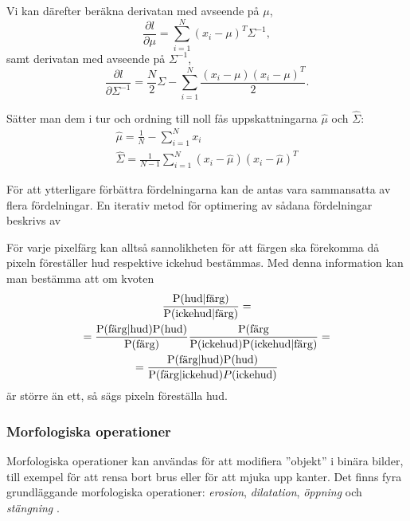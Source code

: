 \documentclass[../rapport_MVEX01-11-05]{subfiles}
\begin{document}
Vi kan därefter beräkna derivatan med avseende på $\mu$,
\begin{equation*}
  \frac{\partial l}{\partial \mu}=\sum_{i=1}^N(x_i-\mu)^T\Sigma^{-1},
\end{equation*}
samt derivatan med avseende på $\Sigma^{-1}$,
\begin{equation*}
  \frac{\partial l}{\partial \Sigma^{-1}}=\frac{N}{2}\Sigma
  -\sum_{i=1}^N\frac{(x_i-\mu)(x_i-\mu)^T}{2}.
\end{equation*}

Sätter man dem i tur och ordning till noll fås uppskattningarna
$\hat\mu$ och $\hat\Sigma$:
\begin{gather*}
  \hat\mu    =\frac{1}{N}-\sum_{i=1}^Nx_i\\
  \hat\Sigma =\frac{1}{N-1}\sum_{i=1}^N(x_i-\hat\mu)(x_i-\hat\mu)^T
\end{gather*}

För att ytterligare förbättra fördelningarna kan de antas vara
sammansatta av flera fördelningar. En iterativ metod för optimering av
sådana fördelningar beskrivs av 

För varje pixelfärg kan alltså sannolikheten för att färgen ska
förekomma då pixeln föreställer hud
respektive ickehud bestämmas. Med denna information kan man bestämma
att om kvoten 
\begin{multline*}
\frac{\mathrm{P}(\textrm{hud}|\textrm{färg})}{\mathrm{P}(\textrm{ickehud}|\textrm{färg})}=\\
=\frac{\mathrm{P}(\textrm{färg}|\textrm{hud})\mathrm{P}(\textrm{hud})}{\mathrm{P}(\textrm{färg})}
 \frac{\mathrm{P}(\textrm{färg}}{\mathrm{P}(\textrm{ickehud})\mathrm{P}(\textrm{ickehud}|\textrm{färg})}=\\
=\frac{\mathrm{P}(\textrm{färg}|\textrm{hud})\mathrm{P}(\textrm{hud})}{\mathrm{P}(\textrm{färg}|\textrm{ickehud})
 P(\textrm{ickehud})}
\end{multline*}
är större än ett, så sägs pixeln föreställa hud. 

\subsubsection{Morfologiska operationer}\label{sec:morph}

Morfologiska operationer kan användas för att modifiera ''objekt'' i
binära bilder, till exempel för att rensa bort brus eller för att
mjuka upp kanter. Det finns fyra grundläggande morfologiska
operationer: \emph{erosion}, \emph{dilatation}, \emph{öppning} och
\emph{stängning} \cite[ss.~25]{Rudemo09}.
\end{document}
